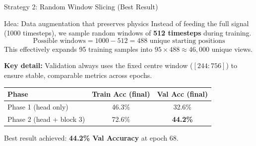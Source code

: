 \documentclass{beamer}
\begin{document}
\begin{frame}{Strategy 2: Random Window Slicing (Best Result)}

    \begin{block}{Idea: Data augmentation that preserves physics}
        Instead of feeding the full signal (1000 timesteps), we sample random windows of \textbf{512 timesteps} during training.
        \[
            \text{Possible windows} = 1000 - 512 = 488 \text{ unique starting positions}
        \]
        This effectively expands 95 training samples into $95 \times 488 \approx 46,000$ unique views.
    \end{block}

    \vspace{0.2cm}
    \textbf{Key detail:} Validation always uses the fixed centre window ($[244:756]$) to ensure stable, comparable metrics across epochs.

    \vspace{0.2cm}
    \begin{table}[]
        \centering
        \begin{tabular}{lcc}
            \toprule
            \textbf{Phase} & \textbf{Train Acc (final)} & \textbf{Val Acc (final)} \\
            \midrule
            Phase 1 (head only) & 46.3\% & 32.6\% \\
            Phase 2 (head + block 3) & 72.6\% & \textbf{44.2\%} \\
            \bottomrule
        \end{tabular}
    \end{table}

    \begin{exampleblock}{}
        Best result achieved: \textbf{44.2\% Val Accuracy} at epoch 68.
    \end{exampleblock}
\end{frame}
\end{document}

